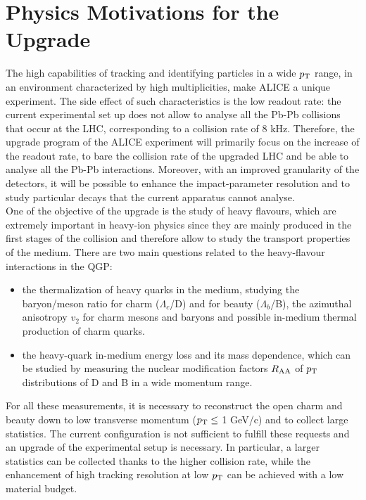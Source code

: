 \section{Physics Motivations for the Upgrade}
The high capabilities of tracking and identifying particles in a wide $p_\text{T}$ range, in an environment characterized by high multiplicities, make ALICE a unique experiment. The side effect of such characteristics is the low readout rate: the current experimental set up does not allow to analyse all the Pb-Pb collisions that occur at the LHC, corresponding to a collision rate of 8 kHz. Therefore, the upgrade program of the ALICE experiment will primarily focus on the increase of the readout rate, to bare the collision rate of the upgraded LHC and be able to analyse all the Pb-Pb interactions. Moreover, with an improved granularity of the detectors, it will be possible to enhance the impact-parameter resolution and to study particular decays that the current apparatus cannot analyse.\\
One of the objective of the upgrade is the study of heavy flavours, which are extremely important in heavy-ion physics since they are mainly produced in the first stages of the collision and therefore allow to study the transport properties of the medium. There are two main questions related to the heavy-flavour interactions in the QGP:
\begin{itemize}
 \item the thermalization of heavy quarks in the medium, studying the baryon/meson ratio for charm ($\Lambda_{c}$/D) and for beauty ($\Lambda_{b}$/B), the azimuthal anisotropy $v_2$ for charm mesons and baryons and possible in-medium thermal production of charm quarks.
 \item the heavy-quark in-medium energy loss and its mass dependence, which can be studied by measuring the nuclear modification factors $R_{\mathrm{AA}}$ of $p_\text{T}$ distributions of D and B in a wide momentum range.
\end{itemize}
For all these measurements, it is necessary to reconstruct the open charm and beauty down to low transverse momentum ($p_\text{T} \leq$ 1 GeV/c) and to collect large statistics. The current configuration is not sufficient to fulfill these requests and an upgrade of the experimental setup is necessary. In particular, a larger statistics can be collected thanks to the higher collision rate, while the enhancement of high tracking resolution at low $p_\text{T}$ can be achieved with a low material budget.\\
